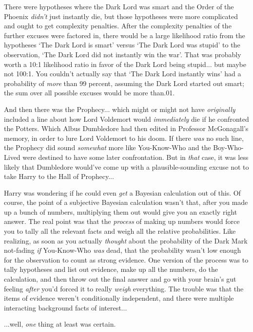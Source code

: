 There were hypotheses where the Dark Lord was smart and the Order of the Phoenix \emph{didn't} just instantly die, but those hypotheses were more complicated and ought to get complexity penalties. After the complexity penalties of the further excuses were factored in, there would be a large likelihood ratio from the hypotheses `The Dark Lord is smart' versus `The Dark Lord was stupid' to the observation, `The Dark Lord did not instantly win the war'. That was probably worth a 10:1 likelihood ratio in favor of the Dark Lord being stupid... but maybe not 100:1. You couldn't actually say that `The Dark Lord instantly wins' had a probability of \emph{more} than 99 percent, assuming the Dark Lord started out smart; the sum over all possible excuses would be more than.01.

And then there was the Prophecy... which might or might not have \emph{originally} included a line about how Lord Voldemort would \emph{immediately} die if he confronted the Potters. Which Albus Dumbledore had then edited in Professor McGonagall's memory, in order to lure Lord Voldemort to his doom. If there \emph{was} no such line, the Prophecy did sound \emph{somewhat} more like You-Know-Who and the Boy-Who-Lived were destined to have some later confrontation. But in \emph{that} case, it was less likely that Dumbledore would've come up with a plausible-sounding excuse not to take Harry to the Hall of Prophecy...

Harry was wondering if he could even \emph{get} a Bayesian calculation out of this. Of course, the point of a subjective Bayesian calculation wasn't that, after you made up a bunch of numbers, multiplying them out would give you an exactly right answer. The real point was that the \emph{process} of making up numbers would force you to tally all the relevant facts and weigh all the relative probabilities. Like realizing, as soon as you actually \emph{thought} about the probability of the Dark Mark not-fading \emph{if} You-Know-Who \emph{was} dead, that the probability wasn't low enough for the observation to count as strong evidence. One version of the process was to tally hypotheses and list out evidence, make up all the numbers, do the calculation, and then throw out the final answer and go with your brain's gut feeling \emph{after} you'd forced it to really \emph{weigh} everything. The trouble was that the items of evidence weren't conditionally independent, and there were multiple interacting background facts of interest...

...well, \emph{one} thing at least was certain.

